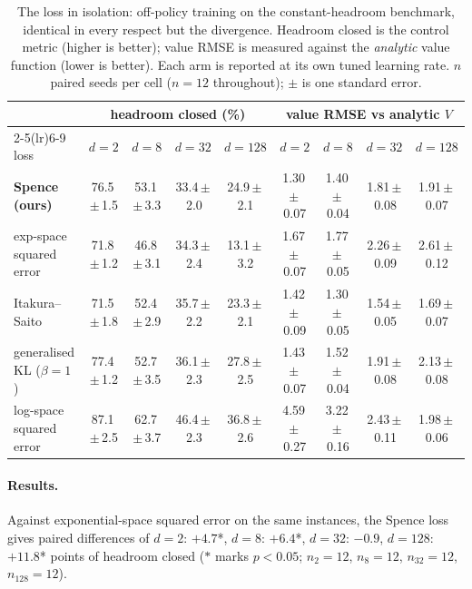 \begin{table}[t]
\centering\small
\caption{The loss in isolation: off-policy training on the
constant-headroom benchmark, identical in every respect but the divergence.
Headroom closed is the control metric (higher is better); value RMSE is
measured against the \emph{analytic} value function (lower is better).
Each arm is reported at its own tuned learning rate. $n$ paired seeds per
cell ($n=12$ throughout); $\pm$ is one standard error.}
\label{tab:ablation}
\begin{tabular}{lcccccccc}
\toprule
& \multicolumn{4}{c}{headroom closed (\%)} & \multicolumn{4}{c}{value RMSE vs analytic $V$}\\
\cmidrule(lr){2-5}\cmidrule(lr){6-9}
loss & $d=2$ & $d=8$ & $d=32$ & $d=128$ & $d=2$ & $d=8$ & $d=32$ & $d=128$\\
\midrule
\textbf{Spence (ours)} & 76.5\,$\pm$\,1.5 & 53.1\,$\pm$\,3.3 & 33.4\,$\pm$\,2.0 & 24.9\,$\pm$\,2.1 & 1.30\,$\pm$\,0.07 & 1.40\,$\pm$\,0.04 & 1.81\,$\pm$\,0.08 & 1.91\,$\pm$\,0.07\\
exp-space squared error & 71.8\,$\pm$\,1.2 & 46.8\,$\pm$\,3.1 & 34.3\,$\pm$\,2.4 & 13.1\,$\pm$\,3.2 & 1.67\,$\pm$\,0.07 & 1.77\,$\pm$\,0.05 & 2.26\,$\pm$\,0.09 & 2.61\,$\pm$\,0.12\\
Itakura--Saito & 71.5\,$\pm$\,1.8 & 52.4\,$\pm$\,2.9 & 35.7\,$\pm$\,2.2 & 23.3\,$\pm$\,2.1 & 1.42\,$\pm$\,0.09 & 1.30\,$\pm$\,0.05 & 1.54\,$\pm$\,0.05 & 1.69\,$\pm$\,0.07\\
generalised KL ($\beta=1$) & 77.4\,$\pm$\,1.2 & 52.7\,$\pm$\,3.5 & 36.1\,$\pm$\,2.3 & 27.8\,$\pm$\,2.5 & 1.43\,$\pm$\,0.07 & 1.52\,$\pm$\,0.04 & 1.91\,$\pm$\,0.08 & 2.13\,$\pm$\,0.08\\
log-space squared error & 87.1\,$\pm$\,2.5 & 62.7\,$\pm$\,3.7 & 46.4\,$\pm$\,2.3 & 36.8\,$\pm$\,2.6 & 4.59\,$\pm$\,0.27 & 3.22\,$\pm$\,0.16 & 2.43\,$\pm$\,0.11 & 1.98\,$\pm$\,0.06\\
\bottomrule
\end{tabular}
\end{table}

\paragraph{Results.}
Against exponential-space squared error on the same instances, the Spence loss gives paired differences of $d=2$: $+4.7$*, $d=8$: $+6.4$*, $d=32$: $-0.9$, $d=128$: $+11.8$* points of headroom closed ($*$ marks $p<0.05$; $n_{2}=12$, $n_{8}=12$, $n_{32}=12$, $n_{128}=12$).
